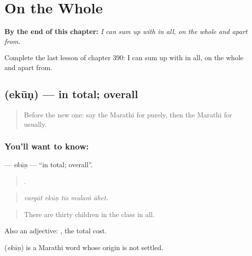 
\chapter{On the Whole}
\label{ch:mr-on-the-whole}

\begin{chapteropening}
\textbf{By the end of this chapter:} \emph{I can sum up with in all, on the whole and apart from.}

Complete the last lesson of chapter 390: I can sum up with in all, on the whole and apart from.
\end{chapteropening}

\section[\texorpdfstring{\mr{एकूण} (ekūṇ)}{एकूण (ekūṇ)}]{ (ekūṇ) — in total; overall}

\label{lesson:MR-C390-ekun}



\begin{quote}
Before the new one: say the Marathi for purely, then the Marathi for usually.
\end{quote}

\subsection*{You'll want to know: }
\textbf{} — \emph{ekūṇ} — \textquotedblleft{}in total; overall\textquotedblright{}.

\begin{quote}
    .
\end{quote}

\begin{quote}
\emph{vargāt ekūṇ tīs mulaṁ āhet.}
\end{quote}

\begin{quote}
There are thirty children in the class in all.
\end{quote}

Also an adjective:  , the total cost.

\begin{cousinweb}
\textbf{} (\emph{ekūṇ}) is a Marathi word whose origin is not settled.
\end{cousinweb}

